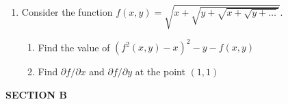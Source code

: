 \begin{enumerate}
\item Consider the function $f(x,y)=\sqrt{x+\sqrt{y+\sqrt{x+\sqrt{y + \ldots }}}}$.
\begin{enumerate}
\item Find the value of $(f^2(x,y)-x)^2-y-f(x,y)$
\item Find $\partial f/\partial x$ and $\partial f/\partial y$ at the point $(1,1)$
\end{enumerate}





\end{enumerate}

\textbf{SECTION B}

